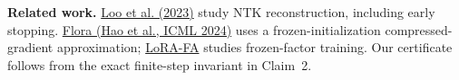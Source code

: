 \documentclass[11pt,a4paper]{article}
\begin{document}
\textbf{Related work.}
\href{https://arxiv.org/abs/2302.01428}{Loo et al. (2023)} study NTK reconstruction,
including early stopping.
\href{https://proceedings.mlr.press/v235/hao24a.html}{Flora (Hao et al., ICML 2024)}
uses a frozen-initialization compressed-gradient approximation;
\href{https://arxiv.org/abs/2308.03303}{LoRA-FA} studies frozen-factor training.
Our certificate follows from the exact finite-step invariant in Claim~2.
\par\endgroup
\label{LastPage}
\end{document}
